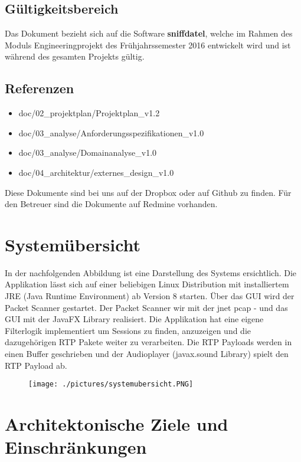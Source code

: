 \documentclass[a4,12pt]{scrartcl}
\begin{document}
\subsection{Gültigkeitsbereich}
Das Dokument bezieht sich auf die Software \textbf{sniffdatel}, welche im Rahmen des Moduls Engineeringprojekt des Frühjahrssemester 2016 entwickelt wird und ist während des gesamten Projekts gültig. 
\subsection{Referenzen}
\begin{itemize}
\item doc/02\_projektplan/Projektplan\_v1.2
\item doc/03\_analyse/Anforderungsspezifikationen\_v1.0
\item doc/03\_analyse/Domainanalyse\_v1.0
\item doc/04\_architektur/externes\_design\_v1.0
\end{itemize}
Diese Dokumente sind bei uns auf der Dropbox oder auf Github zu finden. Für den Betreuer sind die Dokumente auf Redmine vorhanden. 

\section{Systemübersicht}
In der nachfolgenden Abbildung ist eine Darstellung des Systems ersichtlich. Die Applikation lässt sich auf einer beliebigen Linux Distribution mit installiertem JRE (Java Runtime Environment) ab Version 8 starten. Über das GUI wird der Packet Scanner gestartet. Der Packet Scanner wir mit der jnet pcap - und das GUI mit der JavaFX Library realisiert. Die Applikation hat eine eigene Filterlogik implementiert um Sessions zu finden, anzuzeigen und die dazugehörigen RTP Pakete weiter zu verarbeiten. Die RTP Payloads werden in einen Buffer geschrieben und der Audioplayer (javax.sound Library) spielt den RTP Payload ab.
\begin{figure} [H]
	\begin{center}
	\texttt{[image: ./pictures/systemubersicht.PNG]}

	\label{Bild Referenz}
	\end{center}
\end{figure}
\section{Architektonische Ziele und Einschränkungen}
\end{document}
